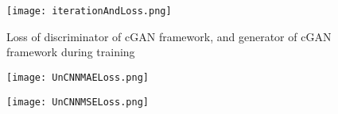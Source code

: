 \documentclass{article}
\begin{document}
\begin{figure}
    \centering
    \texttt{[image: iterationAndLoss.png]}
    \caption{Loss of discriminator of cGAN framework, and generator of cGAN framework during training}
    \label{fig::iterationAndLoss}
\end{figure}
\begin{figure}
\centering
\begin{minipage}{.45\textwidth}
  \centering
  \texttt{[image: UnCNNMAELoss.png]}
  \label{fig:CNNtest1Loss}
\end{minipage}
\begin{minipage}{.45\textwidth}
  \centering
  \texttt{[image: UnCNNMSELoss.png]}
  \label{fig:CNNtest2Loss}
\end{minipage}
\end{figure}
\end{document}
